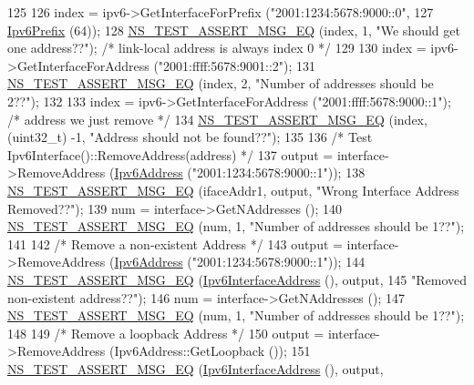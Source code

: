 \begin{DoxyCode}
125 
126   index = ipv6->GetInterfaceForPrefix (\textcolor{stringliteral}{"2001:1234:5678:9000::0"},
127                                        \hyperlink{classns3_1_1Ipv6Prefix}{Ipv6Prefix} (64));
128   \hyperlink{group__testing_ga2a9d78cffb3db8e867c35fff0b698cf5}{NS\_TEST\_ASSERT\_MSG\_EQ} (index, 1, \textcolor{stringliteral}{"We should get one address??"}); \textcolor{comment}{/* link-local
       address is always index 0 */}
129 
130   index = ipv6->GetInterfaceForAddress (\textcolor{stringliteral}{"2001:ffff:5678:9001::2"});
131   \hyperlink{group__testing_ga2a9d78cffb3db8e867c35fff0b698cf5}{NS\_TEST\_ASSERT\_MSG\_EQ} (index, 2, \textcolor{stringliteral}{"Number of addresses should be 2??"});
132 
133   index = ipv6->GetInterfaceForAddress (\textcolor{stringliteral}{"2001:ffff:5678:9000::1"}); \textcolor{comment}{/* address we just remove */}
134   \hyperlink{group__testing_ga2a9d78cffb3db8e867c35fff0b698cf5}{NS\_TEST\_ASSERT\_MSG\_EQ} (index, (uint32\_t) -1, \textcolor{stringliteral}{"Address should not be found??"});
135 
136   \textcolor{comment}{/* Test Ipv6Interface()::RemoveAddress(address) */}
137   output = interface->RemoveAddress (\hyperlink{classns3_1_1Ipv6Address}{Ipv6Address} (\textcolor{stringliteral}{"2001:1234:5678:9000::1"}));
138   \hyperlink{group__testing_ga2a9d78cffb3db8e867c35fff0b698cf5}{NS\_TEST\_ASSERT\_MSG\_EQ} (ifaceAddr1, output, \textcolor{stringliteral}{"Wrong Interface Address Removed??"});
139   num = interface->GetNAddresses ();
140   \hyperlink{group__testing_ga2a9d78cffb3db8e867c35fff0b698cf5}{NS\_TEST\_ASSERT\_MSG\_EQ} (num, 1, \textcolor{stringliteral}{"Number of addresses should be 1??"});
141   
142   \textcolor{comment}{/* Remove a non-existent Address */}
143   output = interface->RemoveAddress (\hyperlink{classns3_1_1Ipv6Address}{Ipv6Address} (\textcolor{stringliteral}{"2001:1234:5678:9000::1"}));
144   \hyperlink{group__testing_ga2a9d78cffb3db8e867c35fff0b698cf5}{NS\_TEST\_ASSERT\_MSG\_EQ} (\hyperlink{classns3_1_1Ipv6InterfaceAddress}{Ipv6InterfaceAddress} (), output, 
145                          \textcolor{stringliteral}{"Removed non-existent address??"});
146   num = interface->GetNAddresses ();
147   \hyperlink{group__testing_ga2a9d78cffb3db8e867c35fff0b698cf5}{NS\_TEST\_ASSERT\_MSG\_EQ} (num, 1, \textcolor{stringliteral}{"Number of addresses should be 1??"});
148 
149   \textcolor{comment}{/* Remove a loopback Address */}
150   output = interface->RemoveAddress (Ipv6Address::GetLoopback ());
151   \hyperlink{group__testing_ga2a9d78cffb3db8e867c35fff0b698cf5}{NS\_TEST\_ASSERT\_MSG\_EQ} (\hyperlink{classns3_1_1Ipv6InterfaceAddress}{Ipv6InterfaceAddress} (), output, 

\end{DoxyCode}
